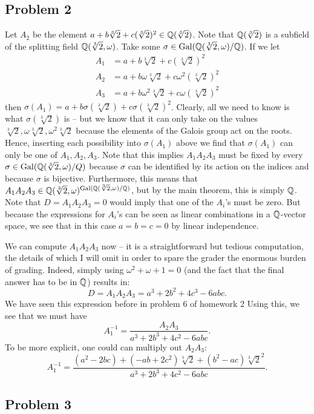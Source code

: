 \documentclass{../../mathnotes}
\begin{document}
\subsection*{Problem 2}
Let $A_2$ be the element $a+b\sqrt[3]{2}+c(\sqrt[3]{2})^2\in\mathbb{Q}(\sqrt[3]{2})$. Note that $\mathbb{Q}(\sqrt[3]{2})$
is a subfield of the splitting field $\mathbb{Q}(\sqrt[3]{2},\omega)$. Take some $\sigma\in\operatorname{Gal}(\mathbb{Q}(\sqrt[3]{2},\omega)/\mathbb{Q})$.
If we let 
\begin{align*}
    A_1&=a+b\sqrt[3]{2}+c(\sqrt[3]{2})^2\\
    A_2&=a+b\omega\sqrt[3]{2}+c\omega^2(\sqrt[3]{2})^2\\
    A_3&=a+b\omega^2\sqrt[3]{2}+c\omega(\sqrt[3]{2})^2
\end{align*}
then $\sigma(A_1)=a+b\sigma(\sqrt[3]{2})+c\sigma(\sqrt[3]{2})^2$. Clearly, all we need to know is what $\sigma(\sqrt[3]{2})$
is -- but we know that it can only take on the values $\sqrt[3]{2},\omega\sqrt[3]{2},\omega^2\sqrt[3]{2}$ because the
elements of the Galois group act on the roots. Hence, inserting each possibility into $\sigma(A_1)$ above we find that
$\sigma(A_1)$ can only be one of $A_1,A_2,A_3$. Note that this implies $A_1A_2A_3$ must be fixed by every $\sigma\in\operatorname{Gal}(\mathbb{Q}(\sqrt[3]{2},\omega)/Q)$
because $\sigma$ can be identified by its action on the indices and because $\sigma$ is bijective. Furthermore, this means
that $A_1A_2A_3\in\mathbb{Q}(\sqrt[3]{2},\omega)^{\operatorname{Gal}(\mathbb{Q}(\sqrt[3]{2},\omega)/\mathbb{Q})}$, but by the main theorem, this is simply $\mathbb{Q}$.
Note that $D=A_1A_2A_3=0$ would imply that one of the $A_i$'s must be zero. But because the expressions for $A_i$'s can be seen
as linear combinations in a $\mathbb{Q}$-vector space, we see that in this case $a=b=c=0$ by linear independence.

We can compute $A_1A_2A_3$ now -- it is a straightforward but tedious computation, the details of which I will omit in order
to spare the grader the enormous burden of grading. Indeed, simply using $\omega^2+\omega+1=0$ (and the fact that the final answer
has to be in $\mathbb{Q}$) results in:
\[D=A_1A_2A_3=a^3+2b^2+4c^3-6abc.\]
We have seen this expression before in problem 6 of homework 2 
Using this, we see that we must have
\[A_1^{-1}=\frac{A_2A_3}{a^3+2b^3+4c^2-6abc}.\]
To be more explicit, one could can multiply out $A_2A_3$:
\[A_1^{-1}=\frac{(a^2-2bc)+(-ab+2c^2)\sqrt[3]{2}+(b^2-ac)\sqrt[3]{2}^2}{a^3+2b^3+4c^2-6abc}.\]


\subsection*{Problem 3}
\end{document}
